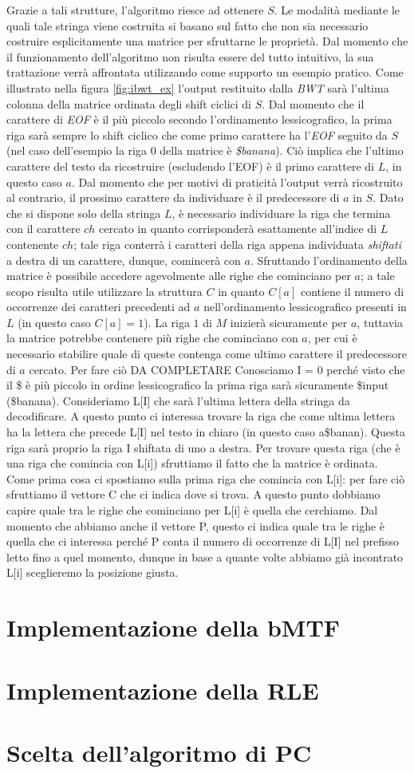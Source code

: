 Grazie a tali strutture, l'algoritmo riesce ad ottenere $S$. Le modalità mediante le quali tale stringa viene costruita si basano sul fatto che non sia necessario costruire esplicitamente una matrice per sfruttarne le proprietà. Dal momento che il funzionamento dell'algoritmo non risulta essere del tutto intuitivo, la sua trattazione verrà affrontata utilizzando come supporto un esempio pratico. Come illustrato nella figura \ref{fig:ibwt_ex} l'output restituito dalla \emph{BWT} sarà l'ultima colonna della matrice ordinata degli shift ciclici di $S$. Dal momento che il carattere di \emph{EOF} è il più piccolo secondo l'ordinamento lessicografico, la prima riga sarà sempre lo shift ciclico che come primo carattere ha l'\emph{EOF} seguito da $S$ (nel caso dell'esempio la riga $0$ della matrice è \emph{\$banana}). Ciò implica che l'ultimo carattere del testo da ricostruire (escludendo l'EOF) è il primo carattere di $L$, in questo caso $a$. Dal momento che per motivi di praticità l'output verrà ricostruito al contrario, il prossimo carattere da individuare è il predecessore di $a$ in $S$. Dato che si dispone solo della stringa $L$, è necessario individuare la riga che termina con il carattere $ch$ cercato in quanto corrisponderà esattamente all'indice di $L$ contenente $ch$; tale riga conterrà i caratteri della riga appena individuata \emph{shiftati} a destra di un carattere, dunque, comincerà con $a$. Sfruttando l'ordinamento della matrice è possibile accedere agevolmente alle righe che cominciano per $a$; a tale scopo risulta utile utilizzare la struttura $C$ in quanto $C[a]$ contiene il numero di occorrenze dei caratteri precedenti ad $a$ nell'ordinamento lessicografico presenti in $L$ (in questo caso $C[a]=1$). La riga $1$ di $M$ inizierà sicuramente per $a$, tuttavia la matrice potrebbe contenere più righe che cominciano con $a$, per cui è necessario stabilire quale di queste contenga come ultimo carattere il predecessore di $a$ cercato. Per fare ciò    
DA COMPLETARE
Conosciamo I = 0 perché visto che il \$ è più piccolo in ordine lessicografico la prima riga sarà sicuramente \$input (\$banana). Consideriamo L[I] che sarà l'ultima lettera della stringa da decodificare. A questo punto ci interessa trovare la riga che come ultima lettera ha la lettera che precede L[I] nel testo in chiaro (in questo caso a\$banan). Questa riga sarà proprio la riga I shiftata di uno a destra. Per trovare questa riga (che è una riga che comincia con L[i]) sfruttiamo il fatto che la matrice è ordinata. Come prima cosa ci spostiamo sulla prima riga che comincia con L[i]: per fare ciò sfruttiamo il vettore C che ci indica dove si trova. A questo punto dobbiamo capire quale tra le righe che cominciano per L[i] è quella che cerchiamo. Dal momento che abbiamo anche il vettore P, questo ci indica quale tra le righe è quella che ci interessa perché P conta il numero di occorrenze di L[I] nel prefisso letto fino a quel momento, dunque in base a quante volte abbiamo già incontrato L[i] sceglieremo la posizione giusta.
\section{Implementazione della bMTF} 
\section{Implementazione della RLE} 
\section{Scelta dell'algoritmo di PC} 
